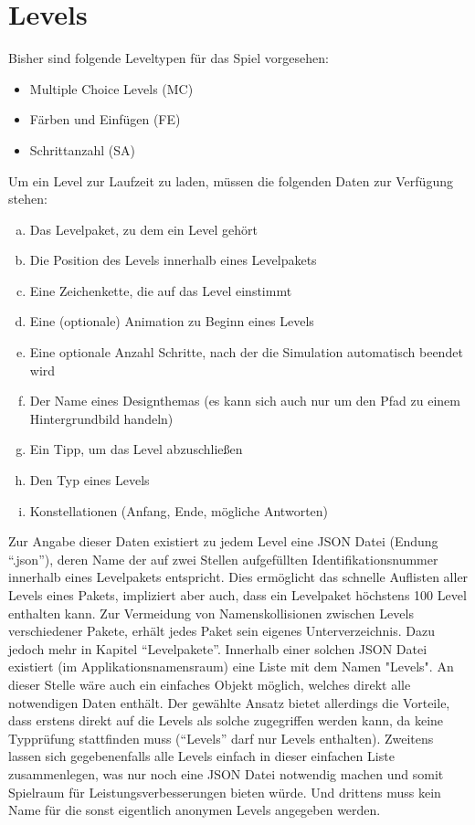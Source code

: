 \section{Levels}
Bisher sind folgende Leveltypen für das Spiel vorgesehen:
\begin{itemize}
	\item Multiple Choice Levels (MC)
	\item Färben und Einfügen (FE)
	\item Schrittanzahl (SA)
\end{itemize}
Um ein Level zur Laufzeit zu laden, müssen die folgenden Daten zur Verfügung stehen:
\begin{enumerate}[a)]
	\item Das Levelpaket, zu dem ein Level gehört
	\item Die Position des Levels innerhalb eines Levelpakets
	\item Eine Zeichenkette, die auf das Level einstimmt
	\item Eine (optionale) Animation zu Beginn eines Levels
	\item Eine optionale Anzahl Schritte, nach der die Simulation automatisch beendet wird
	\item Der Name eines Designthemas (es kann sich auch nur um den Pfad zu einem Hintergrundbild handeln)
	\item Ein Tipp, um das Level abzuschließen
	\item Den Typ eines Levels
	\item Konstellationen (Anfang, Ende, mögliche Antworten)
\end{enumerate}
Zur Angabe dieser Daten existiert zu jedem Level eine JSON Datei (Endung "`.json"'), deren Name der auf zwei Stellen aufgefüllten Identifikationsnummer innerhalb eines Levelpakets entspricht.
Dies ermöglicht das schnelle Auflisten aller Levels eines Pakets, impliziert aber auch, dass ein Levelpaket höchstens 100 Level enthalten kann.
Zur Vermeidung von Namenskollisionen zwischen Levels verschiedener Pakete, erhält jedes Paket sein eigenes Unterverzeichnis.
Dazu jedoch mehr in Kapitel "`Levelpakete"'.
Innerhalb einer solchen JSON Datei existiert (im Applikationsnamensraum) eine Liste mit dem Namen "Levels".
An dieser Stelle wäre auch ein einfaches Objekt möglich, welches direkt alle notwendigen Daten enthält.
Der gewählte Ansatz bietet allerdings die Vorteile, dass erstens direkt auf die Levels als solche zugegriffen werden kann, da keine Typprüfung stattfinden muss ("`Levels"' darf nur Levels enthalten).
Zweitens lassen sich gegebenenfalls alle Levels einfach in dieser einfachen Liste zusammenlegen, was nur noch eine JSON Datei notwendig machen und somit Spielraum für Leistungsverbesserungen bieten würde.
Und drittens muss kein Name für die sonst eigentlich anonymen Levels angegeben werden.


